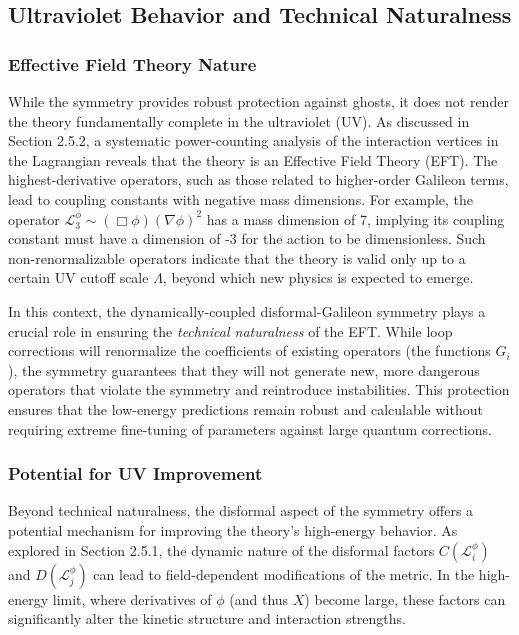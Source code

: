\documentclass[twocolumn]{aastex631}
\begin{document}
\subsection{Ultraviolet Behavior and Technical Naturalness}

\subsubsection{Effective Field Theory Nature}
While the symmetry provides robust protection against ghosts, it does not render the theory fundamentally complete in the ultraviolet (UV). As discussed in Section 2.5.2, a systematic power-counting analysis of the interaction vertices in the Lagrangian reveals that the theory is an Effective Field Theory (EFT). The highest-derivative operators, such as those related to higher-order Galileon terms, lead to coupling constants with negative mass dimensions. For example, the operator $\mathcal{L}_3^\phi \sim (\Box \phi) (\nabla\phi)^2$ has a mass dimension of 7, implying its coupling constant must have a dimension of -3 for the action to be dimensionless. Such non-renormalizable operators indicate that the theory is valid only up to a certain UV cutoff scale $\Lambda$, beyond which new physics is expected to emerge.

In this context, the dynamically-coupled disformal-Galileon symmetry plays a crucial role in ensuring the \textit{technical naturalness} of the EFT. While loop corrections will renormalize the coefficients of existing operators (the functions $G_i$), the symmetry guarantees that they will not generate new, more dangerous operators that violate the symmetry and reintroduce instabilities. This protection ensures that the low-energy predictions remain robust and calculable without requiring extreme fine-tuning of parameters against large quantum corrections.

\subsubsection{Potential for UV Improvement}
Beyond technical naturalness, the disformal aspect of the symmetry offers a potential mechanism for improving the theory's high-energy behavior. As explored in Section 2.5.1, the dynamic nature of the disformal factors $C(\mathcal{L}_i^\phi)$ and $D(\mathcal{L}_j^\phi)$ can lead to field-dependent modifications of the metric. In the high-energy limit, where derivatives of $\phi$ (and thus $X$) become large, these factors can significantly alter the kinetic structure and interaction strengths.
\end{document}
